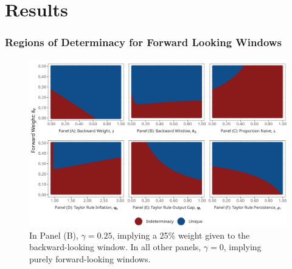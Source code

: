 \documentclass{beamer}
\begin{document}
\section*{Results}

\begin{frame}
	\frametitle{Regions of Determinacy for Forward Looking Windows}	
	\begin{center}		
		\begin{figure}%
			\includegraphics[width=\textwidth,height=0.7\textheight,keepaspectratio]{../code/determinacy_notitle.png}
			\caption{{\tiny In Panel (B), $\gamma = 0.25$, implying a 25\% weight given to the backward-looking window. In all other panels, $\gamma =0$, implying purely forward-looking windows.}}
		\end{figure}%
	\end{center}%
\end{frame}
\end{document}
